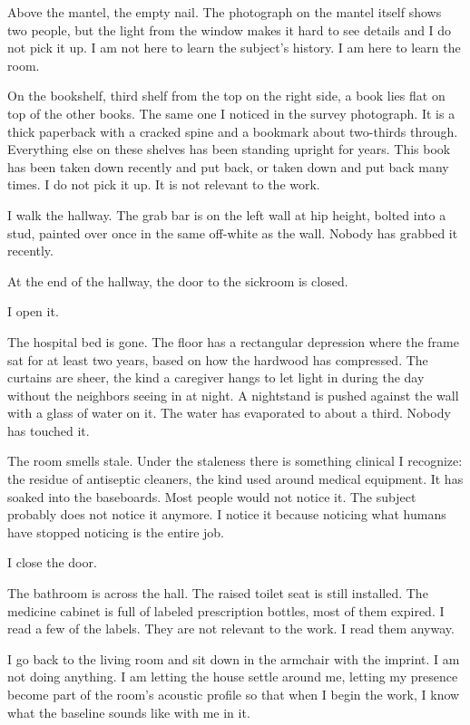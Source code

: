 Above the mantel, the empty nail. The photograph on the mantel itself shows two people, but the light from the window makes it hard to see details and I do not pick it up. I am not here to learn the subject's history. I am here to learn the room.

On the bookshelf, third shelf from the top on the right side, a book lies flat on top of the other books. The same one I noticed in the survey photograph. It is a thick paperback with a cracked spine and a bookmark about two-thirds through. Everything else on these shelves has been standing upright for years. This book has been taken down recently and put back, or taken down and put back many times. I do not pick it up. It is not relevant to the work.

I walk the hallway. The grab bar is on the left wall at hip height, bolted into a stud, painted over once in the same off-white as the wall. Nobody has grabbed it recently.

At the end of the hallway, the door to the sickroom is closed.

I open it.

The hospital bed is gone. The floor has a rectangular depression where the frame sat for at least two years, based on how the hardwood has compressed. The curtains are sheer, the kind a caregiver hangs to let light in during the day without the neighbors seeing in at night. A nightstand is pushed against the wall with a glass of water on it. The water has evaporated to about a third. Nobody has touched it.

The room smells stale. Under the staleness there is something clinical I recognize: the residue of antiseptic cleaners, the kind used around medical equipment. It has soaked into the baseboards. Most people would not notice it. The subject probably does not notice it anymore. I notice it because noticing what humans have stopped noticing is the entire job.

I close the door.

The bathroom is across the hall. The raised toilet seat is still installed. The medicine cabinet is full of labeled prescription bottles, most of them expired. I read a few of the labels. They are not relevant to the work. I read them anyway.

I go back to the living room and sit down in the armchair with the imprint. I am not doing anything. I am letting the house settle around me, letting my presence become part of the room's acoustic profile so that when I begin the work, I know what the baseline sounds like with me in it.

